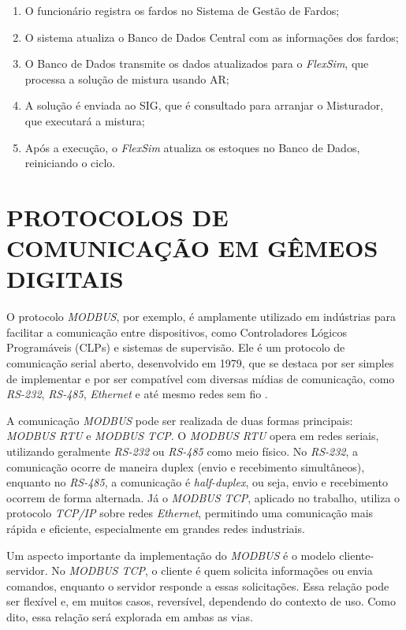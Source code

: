 \documentclass[
    12pt,                %
    openright,           %
    oneside,             %
    a4paper,             %
    english,             %
    spanish,             %
    brazil               %
]{ufscar}
\begin{document}
\begin{enumerate}
    \item O funcionário registra os fardos no Sistema de Gestão de Fardos;
    \item O sistema atualiza o Banco de Dados Central com as informações dos fardos;
    \item O Banco de Dados transmite os dados atualizados para o \textit{FlexSim}, que processa a solução de mistura usando AR;
    \item A solução é enviada ao SIG, que é consultado para arranjar o Misturador, que executará a mistura;
    \item Após a execução, o \textit{FlexSim} atualiza os estoques no Banco de Dados, reiniciando o ciclo.
\end{enumerate}


\section{PROTOCOLOS DE COMUNICAÇÃO EM GÊMEOS DIGITAIS}

O protocolo \textit{MODBUS}, por exemplo, é amplamente utilizado em indústrias para facilitar a comunicação entre dispositivos, como Controladores Lógicos Programáveis (CLPs) e sistemas de supervisão. Ele é um protocolo de comunicação serial aberto, desenvolvido em 1979, que se destaca por ser simples de implementar e por ser compatível com diversas mídias de comunicação, como \textit{RS-232}, \textit{RS-485}, \textit{Ethernet} e até mesmo redes sem fio \cite{tamboli_implementation_2015}.

A comunicação \textit{MODBUS} pode ser realizada de duas formas principais: \textit{MODBUS RTU} e \textit{MODBUS TCP}. O \textit{MODBUS RTU} opera em redes seriais, utilizando geralmente \textit{RS-232} ou \textit{RS-485} como meio físico. No \textit{RS-232}, a comunicação ocorre de maneira duplex (envio e recebimento simultâneos), enquanto no \textit{RS-485}, a comunicação é \textit{half-duplex}, ou seja, envio e recebimento ocorrem de forma alternada. Já o \textit{MODBUS TCP}, aplicado no trabalho, utiliza o protocolo \textit{TCP/IP} sobre redes \textit{Ethernet}, permitindo uma comunicação mais rápida e eficiente, especialmente em grandes redes industriais.

Um aspecto importante da implementação do \textit{MODBUS} é o modelo cliente-servidor. No \textit{MODBUS TCP}, o cliente é quem solicita informações ou envia comandos, enquanto o servidor responde a essas solicitações. Essa relação pode ser flexível e, em muitos casos, reversível, dependendo do contexto de uso. Como dito, essa relação será explorada em ambas as vias.
\end{document}
